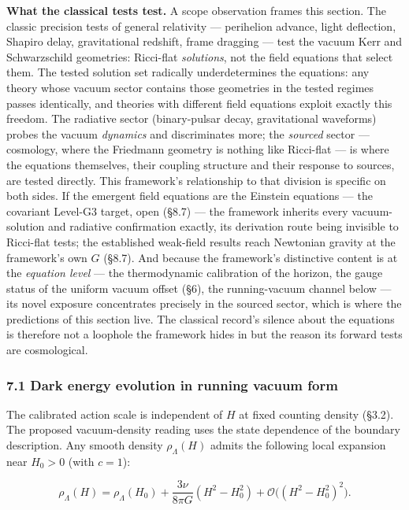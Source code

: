 \documentclass[
]{article}
\begin{document}
\textbf{What the classical tests test.} A scope observation frames this
section. The classic precision tests of general relativity ---
perihelion advance, light deflection, Shapiro delay, gravitational
redshift, frame dragging --- test the vacuum Kerr and Schwarzschild
geometries: Ricci-flat \emph{solutions}, not the field equations that
select them. The tested solution set radically underdetermines the
equations: any theory whose vacuum sector contains those geometries in
the tested regimes passes identically, and theories with different field
equations exploit exactly this freedom. The radiative sector
(binary-pulsar decay, gravitational waveforms) probes the vacuum
\emph{dynamics} and discriminates more; the \emph{sourced} sector ---
cosmology, where the Friedmann geometry is nothing like Ricci-flat ---
is where the equations themselves, their coupling structure and their
response to sources, are tested directly. This framework's relationship
to that division is specific on both sides. If the emergent field
equations are the Einstein equations --- the covariant Level-G3 target,
open (§8.7) --- the framework inherits every vacuum-solution and
radiative confirmation exactly, its derivation route being invisible to
Ricci-flat tests; the established weak-field results reach Newtonian
gravity at the framework's own \(G\) (§8.7). And because the framework's
distinctive content is at the \emph{equation level} --- the
thermodynamic calibration of the horizon, the gauge status of the
uniform vacuum offset (§6), the running-vacuum channel below --- its
novel exposure concentrates precisely in the sourced sector, which is
where the predictions of this section live. The classical record's
silence about the equations is therefore not a loophole the framework
hides in but the reason its forward tests are cosmological.

\hypertarget{dark-energy-evolution-in-running-vacuum-form}{%
\subsubsection{7.1 Dark energy evolution in running vacuum
form}\label{dark-energy-evolution-in-running-vacuum-form}}

The calibrated action scale is independent of \(H\) at fixed counting
density (§3.2). The proposed vacuum-density reading uses the state
dependence of the boundary description. Any smooth density
\(\rho_\Lambda(H)\) admits the following local expansion near \(H_0>0\)
(with \(c=1\)):

\[\rho_\Lambda(H)=\rho_\Lambda(H_0)+\frac{3\nu}{8\pi G}(H^2-H_0^2)+\mathcal{O}\bigl((H^2-H_0^2)^2\bigr).\]
\end{document}
